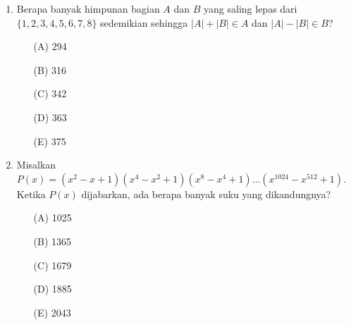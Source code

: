 \documentclass[11pt, a4paper]{scrartcl}
\begin{document}
\begin{enumerate}
    \item Berapa banyak himpunan bagian $A$ dan $B$ yang saling lepas dari $\{1, 2, 3, 4, 5, 6, 7, 8\}$ sedemikian sehingga $|A|+|B|\in A$ dan $|A|-|B|\in B$?
    \begin{itemize}
        \item[(A)] 294
        \item[(B)] 316
        \item[(C)] 342
        \item[(D)] 363
        \item[(E)] 375
    \end{itemize}

    \item Misalkan $P(x)=(x^{2}-x+1)(x^{4}-x^{2}+1)(x^{8}-x^{4}+1)\dots(x^{1024}-x^{512}+1)$. Ketika $P(x)$ dijabarkan, ada berapa banyak suku yang dikandungnya?
    \begin{itemize}
        \item[(A)] 1025
        \item[(B)] 1365
        \item[(C)] 1679
        \item[(D)] 1885
        \item[(E)] 2043
    \end{itemize}
\end{enumerate}
\end{document}
